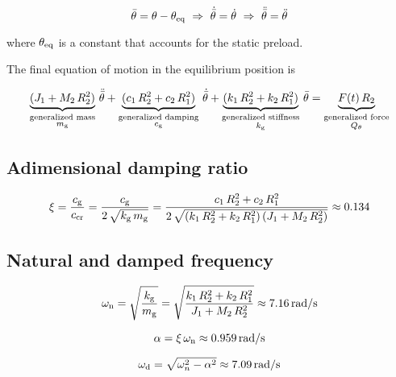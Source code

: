 \documentclass[a4paper,12pt,oneside]{article}
\begin{document}
\[
	\bar{\theta} = \theta - \theta_\textup{eq} ~ \Rightarrow ~
		\dot{\bar{\theta}} = \dot{\theta} ~ \Rightarrow ~
		\ddot{\bar{\theta}} = \ddot{\theta}
\]

where $ \theta_\textup{eq} $ is a constant that accounts for the static preload.

The final equation of motion in the equilibrium position is

\[
\label{eqn:motion}
	\underbrace{(J_1 + M_2 \, R_2^2)}_
		{\substack{\text{generalized mass} \\ \text{$ m_\textup{g} $}}} \,
		\ddot{\bar{\theta}} +	\underbrace{(c_1 \, R_2^2 + c_2 \, R_1^2)}_
		{\substack{\text{generalized damping} \\ \text{$ c_\textup{g} $}}} \,
		\dot{\bar{\theta}} + \underbrace{(k_1 \, R_2^2 + k_2 \, R_1^2)}_
		{\substack{\text{generalized stiffness} \\ \text{$ k_\textup{g} $}}} \,
		\bar{\theta} = \underbrace{F(t) \, R_2}_
		{\substack{\text{generalized force} \\ \text{$ Q_\theta $}}}
\]

\subsection{Adimensional damping ratio}

\begin{equation}
\label{eqn:damping_ratio}
	\xi = \frac{c_\textup{g}}{c_\textup{cr}} =
		\frac{c_\textup{g}}{2 \, \sqrt{k_\textup{g} \, m_\textup{g}}}
		= \frac{c_1 \, R_2^2 + c_2 \, R_1^2}
		{2 \, \sqrt{(k_1 \, R_2^2 + k_2 \, R_1^2) \, (J_1 + M_2 \, R_2^2)}}
		\approx 0.134
\end{equation}

\subsection{Natural and damped frequency}

\[
	\omega_\textup{n} = \sqrt{\frac{k_\textup{g}}{m_\textup{g}}} =
		\sqrt{\frac{k_1 \, R_2^2 + k_2 \, R_1^2}{J_1 + M_2 \, R_2^2}}
		\approx 7.16 \, \text{rad/s}
\]

\begin{equation}
\label{eqn:damping_factor}
  \alpha = \xi \, \omega_\textup{n} \approx 0.959 \, \text{rad/s}
\end{equation}

\begin{equation}
\label{eqn:damped_frequency}
	\omega_\textup{d} = \sqrt{\omega_n^2 - \alpha^2} \approx 7.09 \, \text{rad/s}
\end{equation}
\end{document}
